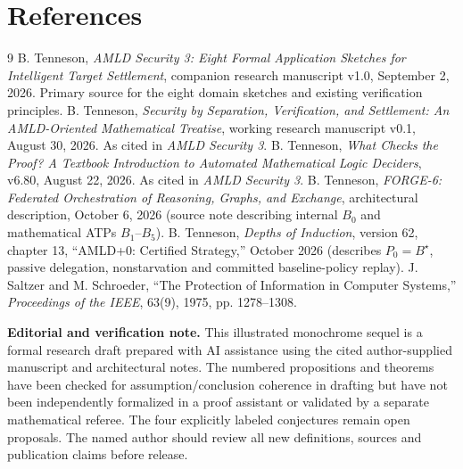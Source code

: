 \documentclass[11pt,letterpaper,oneside]{book}
\theoremstyle{definition}
\theoremstyle{remark}
\begin{document}
\chapter*{References}
\begin{thebibliography}{9}
 B. Tenneson, \emph{AMLD Security 3: Eight Formal Application Sketches for Intelligent Target Settlement}, companion research manuscript v1.0, September 2, 2026. Primary source for the eight domain sketches and existing verification principles.
 B. Tenneson, \emph{Security by Separation, Verification, and Settlement: An AMLD-Oriented Mathematical Treatise}, working research manuscript v0.1, August 30, 2026. As cited in \emph{AMLD Security 3}.
 B. Tenneson, \emph{What Checks the Proof? A Textbook Introduction to Automated Mathematical Logic Deciders}, v6.80, August 22, 2026. As cited in \emph{AMLD Security 3}.
 B. Tenneson, \emph{FORGE-6: Federated Orchestration of Reasoning, Graphs, and Exchange}, architectural description, October 6, 2026 (source note describing internal $B_0$ and mathematical ATPs $B_1$--$B_5$).
 B. Tenneson, \emph{Depths of Induction}, version 62, chapter 13, ``AMLD+0: Certified Strategy,'' October 2026 (describes $P_0=B^\star$, passive delegation, nonstarvation and committed baseline-policy replay).
 J. Saltzer and M. Schroeder, ``The Protection of Information in Computer Systems,'' \emph{Proceedings of the IEEE}, 63(9), 1975, pp. 1278--1308.
\end{thebibliography}
\vspace{1.5em}\noindent\textbf{Editorial and verification note.}
This illustrated monochrome sequel is a formal research draft prepared with AI assistance
using the cited author-supplied manuscript and architectural notes.
The numbered propositions and theorems have been checked for
assumption/conclusion coherence in drafting but have not been
independently formalized in a proof assistant or validated by a
separate mathematical referee. The four explicitly labeled
conjectures remain open proposals. The named author should review
all new definitions, sources and publication claims before release.
\end{document}
